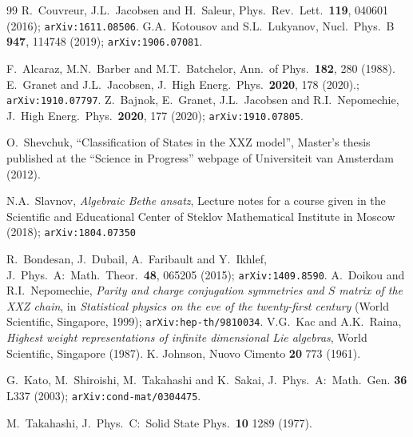 \documentclass[a4paper,10pt]{article}
\begin{document}
\begin{thebibliography}{99}
 R.\ Couvreur, J.L.\ Jacobsen and H.\ Saleur, Phys.\ Rev.\ Lett.\ {\bf 119}, 040601 (2016); {\tt arXiv:1611.08506}.
 G.A.\ Kotousov and S.L.\ Lukyanov, %
Nucl.\ Phys.\ B {\bf 947}, 114748 (2019); {\tt arXiv:1906.07081}.

 F.\ Alcaraz, M.N.\ Barber and M.T.\ Batchelor, Ann.\ of Phys.\ {\bf 182}, 280 (1988).
 E.\ Granet and J.L.\ Jacobsen, J.\ High Energ.\ Phys.\ {\bf 2020}, 178 (2020).; {\tt arXiv:1910.07797}.
 Z.\ Bajnok, E.\ Granet, J.L.\ Jacobsen and R.I.\ Nepomechie, J.\ High Energ.\ Phys.\  {\bf 2020}, 177 (2020); {\tt arXiv:1910.07805}.

 O.\ Shevchuk, ``Classification of States in the XXZ model'', Master's thesis published at the ``Science in Progress'' webpage of Universiteit van Amsterdam (2012).


 N.A.\ Slavnov, {\sl Algebraic Bethe ansatz}, Lecture notes for a course  given in the Scientific and Educational Center of Steklov Mathematical Institute in Moscow (2018); {\tt arXiv:1804.07350}


 R.\ Bondesan, J.\ Dubail, A.\ Faribault and Y.\ Ikhlef, J.\ Phys.\ A:\ Math.\ Theor.\ {\bf 48}, 065205 (2015); {\tt arXiv:1409.8590}.
 A.\ Doikou and R.I.\ Nepomechie, {\sl Parity and charge conjugation symmetries and $S$ matrix of the XXZ chain}, in {\sl Statistical physics on the eve of the twenty-first century} (World Scientific, Singapore, 1999); {\tt arXiv:hep-th/9810034}.
 V.G.\ Kac and A.K.\ Raina, {\sl Highest weight representations of infinite dimensional Lie algebras}, World Scientific, Singapore  (1987).
 K. Johnson, Nuovo Cimento {\bf 20} 773 (1961).


  G.\ Kato,  M.\ Shiroishi, M.\ Takahashi
and K.\ Sakai, %
J.\ Phys.\ A:\ Math.\ Gen. \textbf{36} L337 (2003); {\tt	arXiv:cond-mat/0304475}.

  M.\ Takahashi, %
  J.\ Phys.\ C:\ Solid State Phys.\ \textbf{10} 1289 (1977).
  
 



\end{thebibliography}
\end{document}
